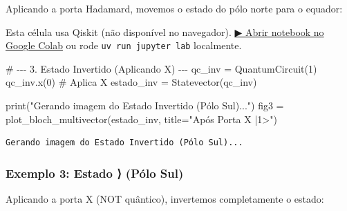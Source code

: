 \documentclass[
  brazilian,
]{report}
\newenvironment{Shaded}{\begin{snugshade}}{\end{snugshade}}
\newcommand{\BuiltInTok}[1]{\textcolor[rgb]{0.00,0.23,0.31}{#1}}
\newcommand{\CommentTok}[1]{\textcolor[rgb]{0.37,0.37,0.37}{#1}}
\newcommand{\DecValTok}[1]{\textcolor[rgb]{0.68,0.00,0.00}{#1}}
\newcommand{\NormalTok}[1]{\textcolor[rgb]{0.00,0.23,0.31}{#1}}
\newcommand{\OperatorTok}[1]{\textcolor[rgb]{0.37,0.37,0.37}{#1}}
\newcommand{\StringTok}[1]{\textcolor[rgb]{0.13,0.47,0.30}{#1}}
\begin{document}
Aplicando a porta Hadamard, movemos o estado do pólo norte para o
equador:

\begin{tcolorbox}[enhanced jigsaw, arc=.35mm, bottomrule=.15mm, bottomtitle=1mm, breakable, colback=white, colbacktitle=quarto-callout-warning-color!10!white, colframe=quarto-callout-warning-color-frame, coltitle=black, left=2mm, leftrule=.75mm, opacityback=0, opacitybacktitle=0.6, rightrule=.15mm, title=\textcolor{quarto-callout-warning-color}{\faExclamationTriangle}\hspace{0.5em}{⚛️ Célula Qiskit --- execute no Colab ou localmente}, titlerule=0mm, toprule=.15mm, toptitle=1mm]

Esta célula usa Qiskit (não disponível no navegador).
\href{https://colab.research.google.com/github/maxwellamaral/aula-quantum/blob/main/notebooks/01-intro.ipynb}{▶
Abrir notebook no Google Colab} ou rode \texttt{uv\ run\ jupyter\ lab}
localmente.

\begin{Shaded}
\begin{Highlighting}[]


\CommentTok{\# {-}{-}{-} 3. Estado Invertido (Aplicando X) {-}{-}{-}}
\NormalTok{qc\_inv }\OperatorTok{=}\NormalTok{ QuantumCircuit(}\DecValTok{1}\NormalTok{)}
\NormalTok{qc\_inv.x(}\DecValTok{0}\NormalTok{) }\CommentTok{\# Aplica X}
\NormalTok{estado\_inv }\OperatorTok{=}\NormalTok{ Statevector(qc\_inv)}

\BuiltInTok{print}\NormalTok{(}\StringTok{"Gerando imagem do Estado Invertido (Pólo Sul)..."}\NormalTok{)}
\NormalTok{fig3 }\OperatorTok{=}\NormalTok{ plot\_bloch\_multivector(estado\_inv, title}\OperatorTok{=}\StringTok{"Após Porta X |1\textgreater{}"}\NormalTok{)}
\end{Highlighting}
\end{Shaded}

\end{tcolorbox}

\begin{verbatim}
Gerando imagem do Estado Invertido (Pólo Sul)...
\end{verbatim}

\subsubsection{Exemplo 3: Estado ⟩ (Pólo
Sul)}\label{exemplo-3-estado-1-puxf3lo-sul}

Aplicando a porta X (NOT quântico), invertemos completamente o estado:
\end{document}
